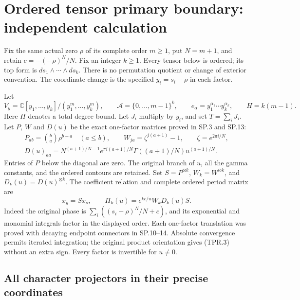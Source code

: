 \section*{Ordered tensor primary boundary: independent calculation}

Fix the same actual zero \(\rho\) of its complete order \(m\geq1\),
put \(N=m+1\), and retain \(c=-(-\rho)^N/N\).
Fix an integer \(k\geq1\). Every tensor below is ordered; its top
form is \(ds_1\wedge\cdots\wedge ds_k\). There is no permutation
quotient or change of exterior convention. The coordinate change
is the specified \(y_i=s_i-\rho\) in each factor.

Let
\[
 V_y=\mathbb C[y_1,\ldots,y_k]/(y_1^m,\ldots,y_k^m),\qquad
 \mathcal A=\{0,\ldots,m-1\}^k,\qquad
 e_\alpha=y_1^{\alpha_1}\cdots y_k^{\alpha_k},\qquad
 H=k(m-1).
 \tag{TPR.1}
\]
Here \(H\) denotes a total degree bound. Let \(J_i\) multiply by
\(y_i\), and set \(T=\sum_iJ_i\). Let \(P\), \(W\) and \(D(u)\)
be the exact one-factor matrices proved in SP.3 and SP.13:
\[
 \begin{gathered}
 P_{ab}=\binom ba\rho^{b-a}\quad(a\leq b),\qquad
 W_{ja}=\zeta^{j(a+1)}-1,\qquad \zeta=e^{2\pi i/N},\\
 D(u)_{aa}
  =N^{(a+1)/N-1}e^{\pi i(a+1)/N}
       \Gamma((a+1)/N)u^{(a+1)/N}.
 \end{gathered}
 \tag{TPR.2}
\]
Entries of \(P\) below the diagonal are zero. The original branch
of \(u\), all the gamma constants, and the ordered contours are
retained. Set \(S=P^{\otimes k}\), \(W_k=W^{\otimes k}\), and
\(D_k(u)=D(u)^{\otimes k}\). The coefficient relation and complete
ordered period matrix are
\[
 x_y=Sx_s,\qquad
 \Pi_k(u)=e^{kc/u}W_kD_k(u)S .
 \tag{TPR.3}
\]
Indeed the original phase is
\(\sum_i((s_i-\rho)^N/N+c)\), and its exponential and monomial
integrals factor in the displayed order. Each one-factor
translation was proved with decaying endpoint connectors in
SP.10--14. Absolute convergence permits iterated integration;
the original product orientation gives (TPR.3) without an extra
sign. Every factor is invertible for \(u\ne0\).

\subsection*{All character projectors in their precise coordinates}

